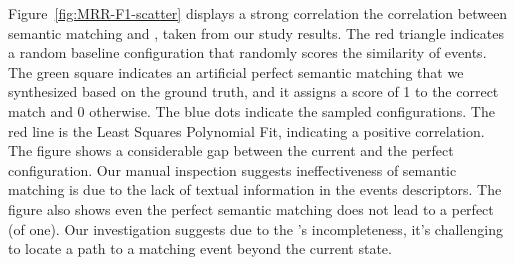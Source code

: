 \smallskip 
Figure~\ref{fig:MRR-F1-scatter} displays a strong correlation the correlation between semantic matching and \testreuse, taken from our study results.
The red triangle indicates a random baseline configuration that randomly scores the similarity of events.
The green square indicates an artificial perfect semantic matching that we synthesized based on the ground truth, and it  assigns a score of 1 to the correct match and 0 otherwise.
The blue dots indicate the sampled configurations.
The red line is 
the Least Squares Polynomial Fit, indicating a positive correlation.
The figure shows a considerable gap between the current \smconfigs and the perfect configuration. 
Our manual inspection suggests ineffectiveness of semantic matching is due to the lack of textual information in the events descriptors.
The figure also shows even the perfect semantic matching does not lead to a perfect \testreuse (\fscore of one).
Our investigation suggests due to the \tam's incompleteness, it's challenging to locate a path to a matching event beyond the current state.



